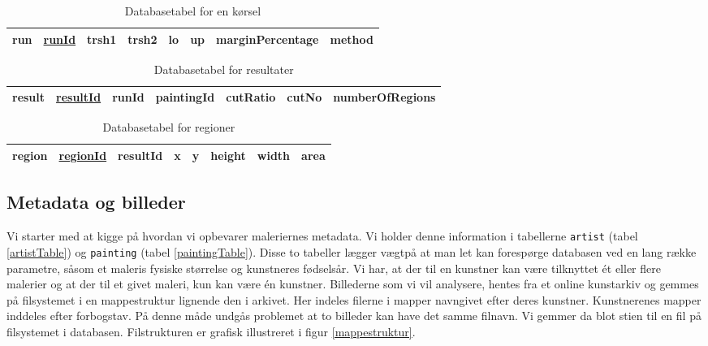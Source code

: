 {\begin{table}[!h]
    \centering
    \begin{tabular}{|l||c|c|c|c|c|c|c|}
        \hline
        \bf{run} \hspace{0.5cm} & \underline{runId} & trsh1 & trsh2 & lo & up & marginPercentage & method \\\hline
    \end{tabular}
    \caption{Databasetabel for en kørsel}
    \label{runTable}
\end{table}

\begin{table}[!h]
    \centering
    \begin{tabular}{|l||c|c|c|c|c|c|}
        \hline
        \bf{result} \hspace{0.5cm} & \underline{resultId} & runId & paintingId & cutRatio & cutNo & numberOfRegions \\\hline
    \end{tabular}
    \caption{Databasetabel for resultater}
    \label{resultTable}
\end{table}

\begin{table}[!h]
    \centering
    \begin{tabular}{|l||c|c|c|c|c|c|c|}
        \hline
        \bf{region} \hspace{0.5cm} & \underline{regionId} & resultId & x & y & height & width & area \\\hline
    \end{tabular}
    \caption{Databasetabel for regioner}
    \label{regionTable}
\end{table}

\subsection{Metadata og billeder\label{section_opbv_billeder}}
Vi starter med at kigge på hvordan vi opbevarer maleriernes metadata. Vi
holder denne information i tabellerne \texttt{artist} (tabel
\ref{artistTable}) og \texttt{painting} (tabel \ref{paintingTable}).
Disse to tabeller lægger vægtpå at man let kan forespørge databasen ved
en lang række parametre, såsom et maleris fysiske størrelse og
kunstneres fødselsår. Vi har, at der til en kunstner kan være tilknyttet
ét eller flere malerier og at der til et givet maleri, kun kan være én
kunstner. Billederne som vi vil analysere, hentes fra et online
kunstarkiv og gemmes på filsystemet i en mappestruktur lignende den i
arkivet. Her indeles filerne i mapper navngivet efter deres kunstner.
Kunstnerenes mapper inddeles efter forbogstav. På denne måde undgås
problemet at to billeder kan have det samme filnavn. Vi gemmer da blot
stien til en fil på filsystemet i databasen. Filstrukturen er grafisk
illustreret i figur \ref{mappestruktur}.

}
